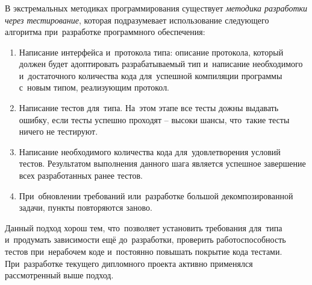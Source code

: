 \subsubsection{}
\label{sec:testing:unit:tdd}

В экстремальных методиках программирования существует \textit{методика разработки через тестирование}, которая подразумевает использование следующего алгоритма при~разработке программного обеспечения:

\begin{enumerate}
	\item Написание интерфейса и~протокола типа: описание протокола, который должен будет адоптировать разрабатываемый тип и~написание необходимого и~достаточного количества кода для~успешной компиляции программы с~новым типом, реализующим протокол.
	\item Написание тестов для~типа. На~этом этапе все тесты дожны выдавать ошибку, если тесты успешно проходят -- высоки шансы, что~такие тесты ничего не тестируют.
	\item Написание необходимого количества кода для~удовлетворения условий тестов. Результатом выполнения данного шага является успешное завершение всех разработанных ранее тестов.
	\item При~обновлении требований или~разработке большой декомпозированной задачи, пункты повторяются заново.
\end{enumerate}

Данный подход хорош тем, что~позволяет установить требования для~типа и~продумать зависимости ещё до~разработки, проверить работоспособность тестов при~нерабочем коде и~постоянно повышать покрытие кода тестами. При~разработке текущего дипломного проекта активно применялся рассмотренный выше подход.